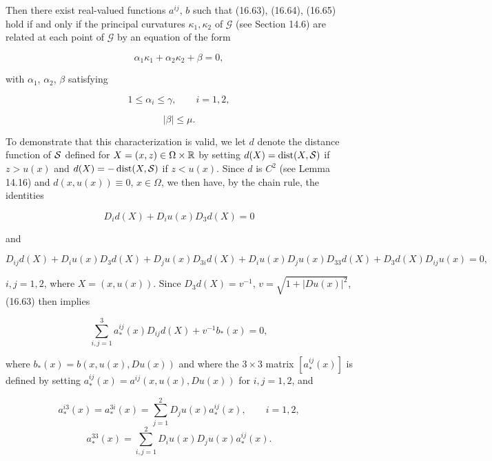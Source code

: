 \noindent Then there exist real-valued functions $a^{ij}$, $b$ such that (16.63), (16.64), (16.65) hold
if and only if the principal curvatures $\kappa_1,\kappa_2$ of $\mathcal{G}$ (see Section 14.6) are related at each
point of $\mathcal{G}$ by an equation of the form

\begin{equation}\tag{16.63$'$}
\alpha_1\kappa_1+\alpha_2\kappa_2+\beta=0,
\end{equation}

\noindent with $\alpha_1$, $\alpha_2$, $\beta$ satisfying

\begin{equation}\tag{16.64$'$}
1\le \alpha_i\le \gamma,\qquad i=1,2,
\end{equation}

\begin{equation}\tag{16.65$'$}
|\beta|\le \mu.
\end{equation}



To demonstrate that this characterization is valid, we let $d$ denote the distance
function of $\mathcal{S}$ defined for $X=(x,z)\in \Omega\times \mathbb{R}$ by setting
$d(X)=\operatorname{dist}(X,\mathcal{S})$ if $z>u(x)$ and
$d(X)=-\operatorname{dist}(X,\mathcal{S})$ if $z<u(x)$. Since $d$ is $C^2$ (see Lemma 14.16) and
$d(x,u(x))\equiv 0$, $x\in \Omega$, we then have, by the chain rule, the identities

\[
D_i d(X)+D_i u(x)D_3 d(X)=0
\]

and

\begin{equation}
D_{ij}d(X)+D_i u(x)D_3 d(X)+D_j u(x)D_{3i}d(X)+D_i u(x)D_j u(x)D_{33}d(X)
+D_3 d(X)D_{ij}u(x)=0,
\tag{16.66}
\end{equation}

$i,j=1,2$, where $X=(x,u(x))$. Since $D_3 d(X)=v^{-1}$, $v=\sqrt{1+|Du(x)|^2}$, (16.63)
then implies

\begin{equation}
\sum_{i,j=1}^3 a_*^{ij}(x)D_{ij}d(X)+v^{-1}b_*(x)=0,
\tag{16.67}
\end{equation}

where $b_*(x)=b(x,u(x),Du(x))$ and where the $3\times 3$ matrix $[a_*^{ij}(x)]$ is defined by
setting $a_*^{ij}(x)=a^{ij}(x,u(x),Du(x))$ for $i,j=1,2$, and

\[
a_*^{i3}(x)=a_*^{3i}(x)=\sum_{j=1}^2 D_j u(x)a_*^{ij}(x),\qquad i=1,2,
\]
\[
a_*^{33}(x)=\sum_{i,j=1}^2 D_i u(x)D_j u(x)a_*^{ij}(x).
\]

